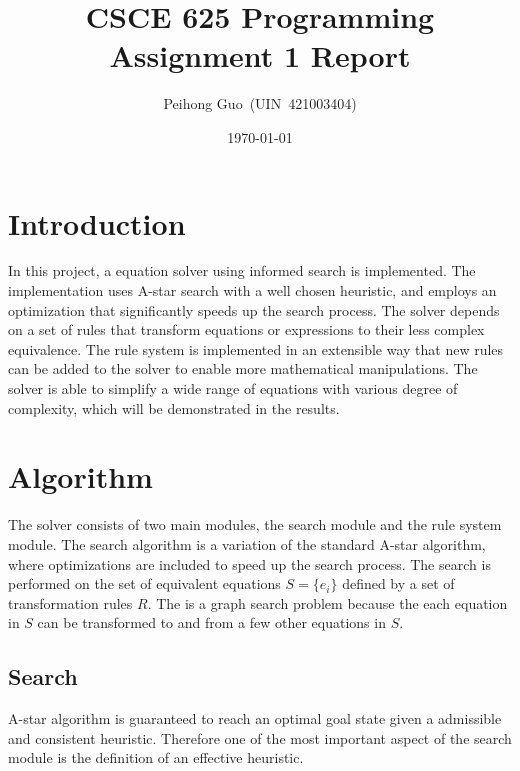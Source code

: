 \documentclass{article}
\title{CSCE 625 Programming Assignment 1 Report}
\author{Peihong Guo~(UIN~421003404)}
\date{\today}
\begin{document}
\maketitle


\section{Introduction}
In this project, a equation solver using informed search is implemented. The implementation uses A-star search with a well chosen heuristic, and employs an optimization that significantly speeds up the search process. The solver depends on a set of rules that transform equations or expressions to their less complex equivalence. The rule system is implemented in an extensible way that new rules can be added to the solver to enable more mathematical manipulations. The solver is able to simplify a wide range of equations with various degree of complexity, which will be demonstrated in the results.

\section{Algorithm}
The solver consists of two main modules, the search module and the rule system module. The search algorithm is a variation of the standard A-star algorithm, where optimizations are included to speed up the search process. The search is performed on the set of equivalent equations $S = \{e_i\}$ defined by a set of transformation rules $R$. The is a graph search problem because the each equation in $S$ can be transformed to and from a few other equations in $S$.

\subsection{Search}
A-star algorithm is guaranteed to reach an optimal goal state given a admissible and consistent heuristic. Therefore one of the most important aspect of the search module is the definition of an effective heuristic.
\end{document}
